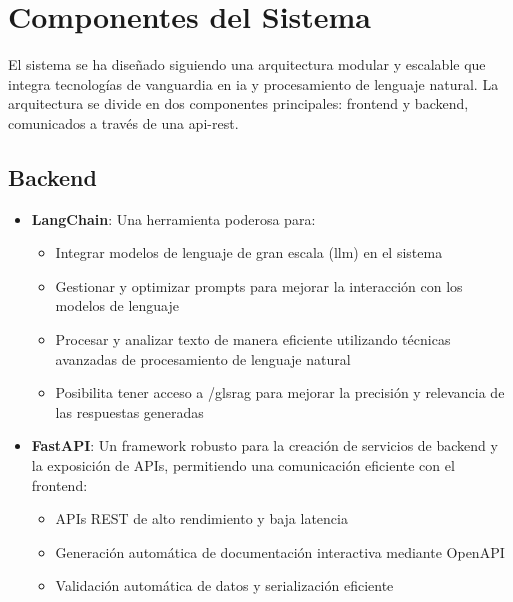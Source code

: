 \section{Componentes del Sistema}

El sistema se ha diseñado siguiendo una arquitectura modular y escalable que integra tecnologías de vanguardia en \gls{ia} y procesamiento de lenguaje natural. La arquitectura se divide en dos componentes principales: frontend y backend, comunicados a través de una \gls{api-rest}.

\subsection{Backend}

\begin{itemize}
	\item \textbf{LangChain}: Una herramienta poderosa para:
	      \begin{itemize}
		      \item Integrar modelos de lenguaje de gran escala (\gls{llm}) en el sistema
		      \item Gestionar y optimizar prompts para mejorar la interacción con los modelos de lenguaje
		      \item Procesar y analizar texto de manera eficiente utilizando técnicas avanzadas de procesamiento de lenguaje natural
		      \item Posibilita tener acceso a /gls{rag} para mejorar la precisión y relevancia de las respuestas generadas
	      \end{itemize}

	\item \textbf{FastAPI}: Un framework robusto para la creación de servicios de backend y la exposición de APIs, permitiendo una comunicación eficiente con el frontend:
	      \begin{itemize}
		      \item APIs REST de alto rendimiento y baja latencia
		      \item Generación automática de documentación interactiva mediante OpenAPI
		      \item Validación automática de datos y serialización eficiente
	      \end{itemize}
\end{itemize}

